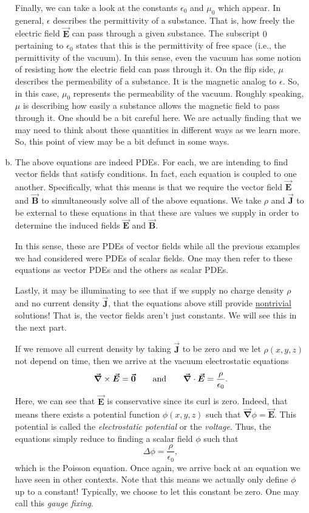 \documentclass[12pt]{article} %
\newcommand{\vecfieldB}{\boldsymbol{\vec{B}}}
\newcommand{\vecfieldE}{\boldsymbol{\vec{E}}}
\newcommand{\vecfieldJ}{\boldsymbol{\vec{J}}}
\newcommand{\grad}{\boldsymbol{\vec{\nabla}}}
\begin{document}
\begin{solution}
\begin{enumerate}[(a)]
    Finally, we can take a look at the constants $\epsilon_0$ and $\mu_0$ which appear.  In general, $\epsilon$ describes the permittivity of a substance.  That is, how freely the electric field $\vecfieldE$ can pass through a given substance.  The subscript $0$ pertaining to $\epsilon_0$ states that this is the permittivity of free space (i.e., the permittivity of the vacuum).  In this sense, even the vacuum has some notion of resisting how the electric field can pass through it. On the flip side, $\mu$ describes the permeability of a substance.  It is the magnetic analog to $\epsilon$. So, in this case, $\mu_0$ represents the permeability of the vacuum.  Roughly speaking, $\mu$ is describing how easily a substance allows the magnetic field to pass through it. One should be a bit careful here.  We are actually finding that we may need to think about these quantities in different ways as we learn more.  So, this point of view may be a bit defunct in some ways.
    
    \item The above equations are indeed PDEs.  For each, we are intending to find vector fields that satisfy conditions.  In fact, each equation is coupled to one another.  Specifically, what this means is that we require the vector field $\vecfieldE$ and $\vecfieldB$ to simultaneously solve all of the above equations. We take $\rho$ and $\vecfieldJ$ to be external to these equations in that these are values we supply in order to determine the induced fields $\vecfieldE$ and $\vecfieldB$.  
    
    In this sense, these are PDEs of vector fields while all the previous examples we had considered were PDEs of scalar fields.  One may then refer to these equations as vector PDEs and the others as scalar PDEs.  
    
    Lastly, it may be illuminating to see that if we supply no charge density $\rho$ and no current density $\vecfieldJ$, that the equations above still provide \underline{nontrivial} solutions! That is, the vector fields aren't just constants.  We will see this in the next part.
    
    If we remove all current density by taking $\vecfieldJ$ to be zero and we let $\rho(x,y,z)$ not depend on time, then we arrive at the vacuum electrostatic equations
    \begin{align*}
        \grad \times \vecfieldE = \zerovec \qquad \textrm{and} \qquad \grad \cdot \vecfieldE = \frac{\rho}{\epsilon_0}.
    \end{align*}
    Here, we can see that $\vecfieldE$ is conservative since its curl is zero.  Indeed, that means there exists a potential function $\phi(x,y,z)$ such that $\grad \phi = \vecfieldE$.  This potential is called the \emph{electrostatic potential} or the \emph{voltage}.  Thus, the equations simply reduce to finding a scalar field $\phi$ such that
    \[
    \Delta \phi = \frac{\rho}{\epsilon_0},
    \]
    which is the Poisson equation.  Once again, we arrive back at an equation we have seen in other contexts. Note that this means we actually only define $\phi$ up to a constant! Typically, we choose to let this constant be zero.  One may call this \emph{gauge fixing}.
    

\end{enumerate}
\end{solution}
\end{document}
